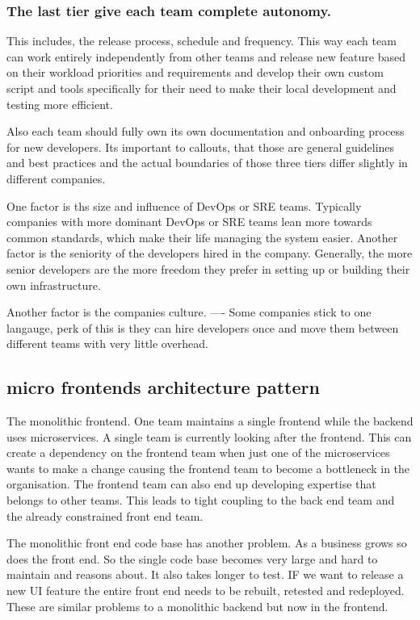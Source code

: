 \documentclass[a4paper, 11pt]{book}
\begin{document}
    \subsubsection{The last tier give each team complete autonomy.}
    This includes, the release process, schedule and frequency.
    This way each team can work entirely independently from other teams and release new feature based on their workload priorities and requirements and develop their own custom script and tools specifically for their need to make their local development and testing more efficient.

    Also each team should fully own its own documentation and onboarding process for new developers.
    Its important to callouts, that those are general guidelines and best practices and the actual boundaries of those three tiers differ slightly in different companies.

    One factor is ths size and influence of DevOps or SRE teams.
    Typically companies with more dominant DevOps or SRE teams lean more towards common standards, which make their life managing the system easier.
    Another factor is the seniority of the developers hired in the company.
    Generally, the more senior developers are the more freedom they prefer in setting up or building their own infrastructure.

    Another factor is the companies culture.
    ---- Some companies stick to one langauge, perk of this is they can hire developers once and move them between different teams with very little overhead.

    \subsection{micro frontends architecture pattern}
    The monolithic frontend.
    One team maintains a single frontend while the backend uses microservices. A single team is currently looking after the frontend.
    This can create a dependency on the frontend team when just one of the microservices wants to make a change causing the frontend team to become a bottleneck in the organisation.
    The frontend team can also end up developing expertise that belongs to other teams.
    This leads to tight coupling to the back end team and the already constrained front end team.

    The monolithic front end code base has another problem.
    As a business grows so does the front end.
    So the single code base becomes very large and hard to maintain and reasons about.
    It also takes longer to test.
    IF we want to release a new UI feature the entire front end needs to be rebuilt, retested and redeployed.
    These are similar problems to a monolithic backend but now in the frontend.
\end{document}
